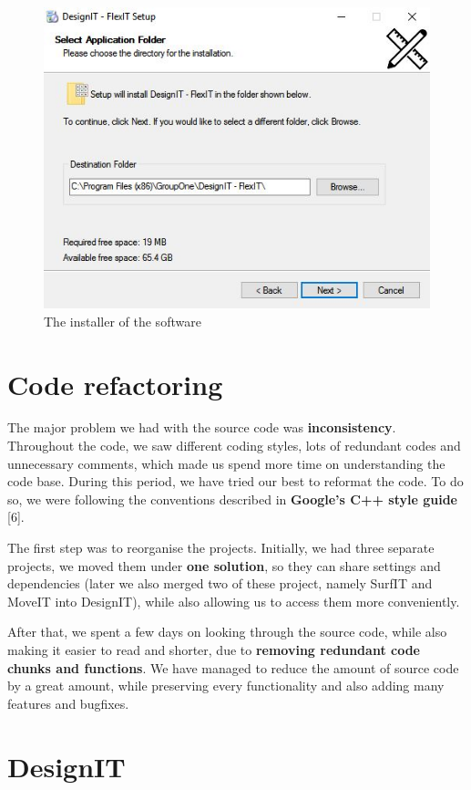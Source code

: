 \documentclass[a4paper, 11pt, article]{report}
\begin{document}
\begin{figure}[H]
\includegraphics[width=13cm]{images/setup}
\caption{The installer of the software}
\centering
\end{figure}

\section{Code refactoring}

The major problem we had with the source code was \textbf{inconsistency}. Throughout the code, we saw different coding styles, lots of redundant codes and unnecessary comments, which made us spend more time on understanding the code base. During this period, we have tried our best to reformat the code. To do so, we were following the conventions described in \textbf{Google's C++ style guide} [6]. 

The first step was to reorganise the projects. Initially, we had three separate projects, we moved them under \textbf{one solution}, so they can share settings and dependencies (later we also merged two of these project, namely SurfIT and MoveIT into DesignIT), while also allowing us to access them more conveniently.

After that, we spent a few days on looking through the source code, while also making it easier to read and shorter, due to \textbf{removing redundant code chunks and functions}. We have managed to reduce the amount of source code by a great amount, while preserving every functionality and also adding many features and bugfixes.

\section{DesignIT}
\end{document}
